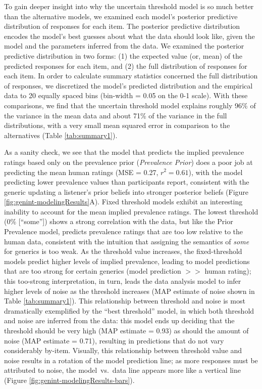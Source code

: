 \documentclass[floatsintext,doc]{apa6}
\begin{document}
To gain deeper insight into why the uncertain threshold model is so much better than the alternative models, we examined each model's posterior predictive distribution of responses for each item. The posterior predictive distribution encodes the model's best guesses about what the data should look like, given the model and the parameters inferred from the data. 
We examined the posterior predictive distribution in two forms: (1) the expected value (or, mean) of the predicted responses for each item, and (2) the full distribution of responses for each item. In order to calculate summary statistics concerned the full distribution of responses, we discretized the model's predicted distribution and the empirical data to 20 equally spaced bins (bin-width = 0.05 on the 0-1 scale). 
With these comparisons, we find that the uncertain threshold model explains roughly 96\% of the variance in the mean data and about 71\% of the variance in the full distributions, with a very small mean squared error in comparison to the alternatives (Table \ref{tab:summary1}). 

As a sanity check, we see that the model that predicts the implied prevalence ratings based only on the prevalence prior (\emph{Prevalence Prior}) does a poor job at predicting the mean human ratings (MSE = 0.27, $r^2 = 0.61$), with the model predicting lower prevalence values than participants report, consistent with the generic updating a listener's prior beliefs into stronger posterior beliefs (Figure \ref{fig:genint-modelingResults}A). 
Fixed threshold models exhibit an interesting inability to account for the mean implied prevalence ratings. The lowest threshold (0\% [``some'']) shows a strong correlation with the data, but like the Prior Prevalence model, predicts prevalence ratings that are too low relative to the human data, consistent with the intuition that assigning the semantics of \emph{some} for generics is too weak.
As the threshold value increases, the fixed-threshold models predict higher levels of implied prevalence, leading to model predictions that are too strong for certain generics (model prediction $>>$ human rating); this too-strong interpretation, in turn, leads the data analysis model to infer higher levels of noise as the threshold increases (MAP estimate of noise shown in Table \ref{tab:summary1}). 
This relationship between threshold and noise is most dramatically exemplified by the ``best threshold'' model, in which both threshold and noise are inferred from the data: this model ends up deciding that the threshold should be very high (MAP estimate = 0.93) as should the amount of noise (MAP estimate = 0.71), resulting in predictions that do not vary considerably by-item. 
Visually, this relationship between threshold value and noise results in a rotation of the model prediction line; as more responses must be attributed to noise, the model~vs.~data line appears more like a vertical line  (Figure \ref{fig:genint-modelingResults-bars}). 
\end{document}
